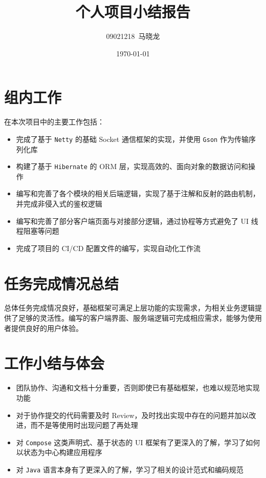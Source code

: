 \documentclass{article}
\title{个人项目小结报告}
\author{09021218~马晓龙}
\date{\today}
\begin{document}
\maketitle

\section{组内工作}

在本次项目中的主要工作包括：

\begin{itemize}
    \item 完成了基于 \texttt{Netty} 的基础 Socket 通信框架的实现，并使用 \texttt{Gson} 作为传输序列化库
    \item 构建了基于 \texttt{Hibernate} 的 ORM 层，实现高效的、面向对象的数据访问和操作
    \item 编写和完善了各个模块的相关后端逻辑，实现了基于注解和反射的路由机制，并完成非侵入式的鉴权逻辑
    \item 编写和完善了部分客户端页面与对接部分逻辑，通过协程等方式避免了 UI 线程阻塞等问题
    \item 完成了项目的 CI/CD 配置文件的编写，实现自动化工作流
\end{itemize}

\section{任务完成情况总结}

总体任务完成情况良好，基础框架可满足上层功能的实现需求，为相关业务逻辑提供了足够的灵活性。编写的客户端界面、服务端逻辑可完成相应需求，能够为使用者提供良好的用户体验。

\section{工作小结与体会}

\begin{itemize}
    \item 团队协作、沟通和文档十分重要，否则即使已有基础框架，也难以规范地实现功能
    \item 对于协作提交的代码需要及时 Review，及时找出实现中存在的问题并加以改进，而不是等使用时出现问题了再处理
    \item 对 \texttt{Compose} 这类声明式、基于状态的 UI 框架有了更深入的了解，学习了如何以状态为中心构建应用程序
    \item 对 \texttt{Java} 语言本身有了更深入的了解，学习了相关的设计范式和编码规范
\end{itemize}
\end{document}
